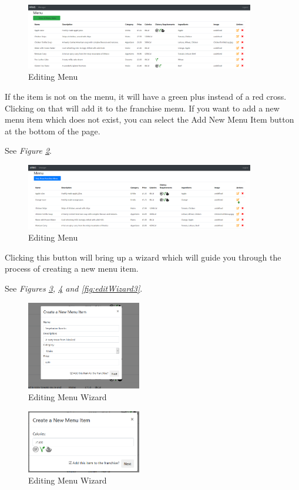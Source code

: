 \documentclass[12pt, twoside, a4paper]{report}
\begin{document}
\begin{figure}[H]
  \centering
  \includegraphics[width=10cm]{editMenu1.png}
  \caption{Editing Menu}
  \label{fig:editMenu1}
\end{figure}

If the item is not on the menu, it will have a green plus instead of a red cross. Clicking on that will add it to the franchise menu. If you want to add a new menu item which does not exist, you can select the Add New Menu Item button at the bottom of the page.

See \textit{Figure \ref{fig:editMenu2}}.
\begin{figure}[H]
  \centering
  \includegraphics[width=10cm]{editMenu2.png}
  \caption{Editing Menu}
  \label{fig:editMenu2}
\end{figure}

Clicking this button will bring up a wizard which will guide you through the process of creating a new menu item.

See \textit{Figures \ref{fig:editWizard1}, \ref{fig:editWizard2} and \ref{fig:editWizard3}}.

\begin{figure}[H]
  \centering
  \includegraphics[width=5cm]{editWizard1.png}
  \caption{Editing Menu Wizard}
  \label{fig:editWizard1}
\end{figure}

\begin{figure}[H]
  \centering
  \includegraphics[width=5cm]{editWizard2.png}
  \caption{Editing Menu Wizard}
  \label{fig:editWizard2}
\end{figure}
\end{document}
